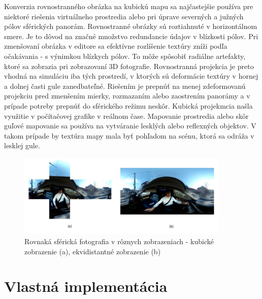 \documentclass[slovak,master,dept460,male,cpp,cpdeclaration]{diploma}
\begin{document}
Konverzia rovnostranného obrázka na kubickú mapu sa najčastejšie používa pre niektoré riešenia virtuálneho prostredia alebo pri úprave severných a južných pólov sférických panorám.
Rovnostranné obrázky sú roztiahnuté v horizontálnom smere. Je to dôvod na značné množstvo redundancie údajov v blízkosti pólov. Pri zmenšovaní obrázka v editore sa efektívne rozlíšenie textúry zníži podľa očakávania - s výnimkou blízkych pólov. To môže spôsobiť radiálne artefakty, ktoré sa zobrazia pri zobrazovaní 3D fotografie. Rovnostranná projekcia je preto vhodná na simuláciu iba tých prostredí, v ktorých sú deformácie textúry v hornej a dolnej časti gule zanedbateľné. Riešením je prepnúť na menej zdeformovanú projekciu pred zmenšením mierky, rozmazaním alebo zaostrením panorámy a v prípade potreby prepnúť do sférického režimu neskôr. Kubická projekmcia našla využitie v počítačovej grafike v reálnom čase. Mapovanie prostredia alebo skôr guľové mapovanie sa používa na vytváranie lesklých alebo reflexných objektov. V takom prípade by textúra mapy mala byť pohľadom na scénu, ktorá sa odráža v lesklej gule.

\begin{figure}[H]
	\centering
	\includegraphics[width=0.9\textwidth]{Figures/cubemapVsEcti.png}
	\caption{Rovnaká sférická fotografia v rôznych zobrazeniach  - kubické zobrazenie (a), ekvidistantné zobrazenie (b)}
	\label{fig:sphereFormats}
\end{figure}




\newpage
\section{Vlastná implementácia}
\label{sec:Vlastná implementácia}
\end{document}
